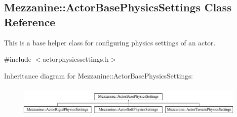\hypertarget{classMezzanine_1_1ActorBasePhysicsSettings}{
\subsection{Mezzanine::ActorBasePhysicsSettings Class Reference}
\label{classMezzanine_1_1ActorBasePhysicsSettings}
}


This is a base helper class for configuring physics settings of an actor.  




{\ttfamily \#include $<$actorphysicssettings.h$>$}

Inheritance diagram for Mezzanine::ActorBasePhysicsSettings:\begin{figure}[H]
\begin{center}
\leavevmode
\includegraphics[height=1.511471cm]{classMezzanine_1_1ActorBasePhysicsSettings}
\end{center}
\end{figure}
